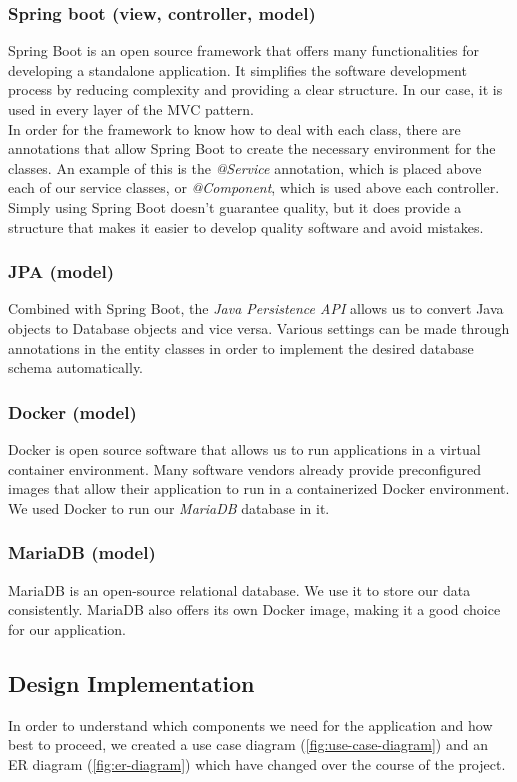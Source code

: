 \subsubsection{Spring boot (view, controller, model)}
Spring Boot is an open source framework that offers many functionalities for developing a standalone application. It simplifies the software development process by reducing complexity and providing a clear structure. In our case, it is used in every layer of the MVC pattern. \\
In order for the framework to know how to deal with each class, there are annotations that allow Spring Boot to create the necessary environment for the classes. An example of this is the \textit{@Service} annotation, which is placed above each of our service classes, or \textit{@Component}, which is used above each controller. \\
Simply using Spring Boot doesn't guarantee quality, but it does provide a structure that makes it easier to develop quality software and avoid mistakes.

\subsubsection{JPA (model)}
Combined with Spring Boot, the \textit{Java Persistence API} allows us to convert Java objects to
Database objects and vice versa. Various settings can be made through annotations in the entity classes in order to implement the desired database schema automatically.

\subsubsection{Docker (model)}
Docker is open source software that allows us to run applications in a virtual container environment. Many software vendors already provide preconfigured images that allow their application to run in a containerized Docker environment. We used Docker to run our \textit{MariaDB} database in it.

\subsubsection{MariaDB (model)}
MariaDB is an open-source relational database. We use it to store our data consistently. MariaDB also offers its own Docker image, making it a good choice for our application.

\subsection{Design Implementation}
In order to understand which components we need for the application and how best to proceed, we created a use case diagram (\ref{fig:use-case-diagram}) and an ER diagram (\ref{fig:er-diagram}) which have changed over the course of the project.

